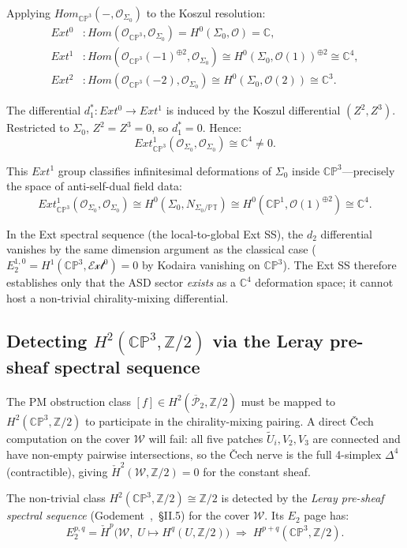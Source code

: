 \documentclass[11pt,a4paper]{article}
\theoremstyle{remark}
\newcommand{\PT}{\mathbb{PT}}
\newcommand{\CP}{\mathbb{CP}}
\newcommand{\C}{\mathbb{C}}
\newcommand{\Z}{\mathbb{Z}}
\newcommand{\cO}{\mathcal{O}}
\newcommand{\barPP}{\overline{\mathcal{P}}}
\begin{document}
Applying $Hom_{\CP^3}(-, \mathcal{O}_{\Sigma_0})$ to the Koszul resolution:
\begin{align*}
  Ext^0 &: Hom(\mathcal{O}_{\CP^3}, \mathcal{O}_{\Sigma_0})
    = H^0(\Sigma_0, \mathcal{O}) = \C, \\
  Ext^1 &: Hom(\mathcal{O}_{\CP^3}(-1)^{\oplus 2},
    \mathcal{O}_{\Sigma_0})
    \cong H^0(\Sigma_0, \mathcal{O}(1))^{\oplus 2}
    \cong \C^4, \\
  Ext^2 &: Hom(\mathcal{O}_{\CP^3}(-2),
    \mathcal{O}_{\Sigma_0})
    \cong H^0(\Sigma_0, \mathcal{O}(2)) \cong \C^3.
\end{align*}

The differential $d_1^*: Ext^0 \to Ext^1$ is induced by the Koszul
differential $(Z^2, Z^3)$. Restricted to $\Sigma_0$, $Z^2 = Z^3 = 0$,
so $d_1^* = 0$. Hence:
\[
  Ext^1_{\CP^3}(\mathcal{O}_{\Sigma_0}, \mathcal{O}_{\Sigma_0})
  \cong \C^4 \neq 0.
\]

This $Ext^1$ group classifies infinitesimal deformations of $\Sigma_0$
inside $\CP^3$---precisely the space of anti-self-dual field data:
\[
  Ext^1_{\CP^3}(\mathcal{O}_{\Sigma_0}, \mathcal{O}_{\Sigma_0})
  \cong H^0(\Sigma_0, N_{\Sigma_0/\PT})
  \cong H^0(\CP^1, \cO(1)^{\oplus 2}) \cong \C^4.
\]

In the Ext spectral sequence (the local-to-global Ext SS), the $d_2$
differential vanishes by the same dimension argument as the classical case
($E_2^{1,0} = H^1(\CP^3, \mathcal{Ext}^0) = 0$ by Kodaira vanishing on
$\CP^3$). The Ext SS therefore establishes only that the ASD sector
\emph{exists} as a $\C^4$ deformation space; it cannot host a non-trivial
chirality-mixing differential.

\subsection{Detecting $H^2(\CP^3, \Z/2)$ via the Leray pre-sheaf spectral sequence}
\label{sec:leray-ss}

The PM obstruction class $[f] \in H^2(\barPP_2, \Z/2)$ must be
mapped to $H^2(\CP^3, \Z/2)$ to participate in the chirality-mixing
pairing. A direct \v{C}ech computation on the cover $\mathcal{W}$
will fail: all five patches $\tilde{U}_i, V_2, V_3$ are connected
and have non-empty pairwise intersections, so the \v{C}ech nerve
is the full 4-simplex $\Delta^4$ (contractible), giving
$\check{H}^2(\mathcal{W}, \Z/2) = 0$ for the constant sheaf.

The non-trivial class $H^2(\CP^3, \Z/2) \cong \Z/2$ is detected by
the \emph{Leray pre-sheaf spectral sequence} (Godement~\cite{Godement1958},~\S II.5)
for the cover $\mathcal{W}$.  Its $E_2$ page has:
\[
  E_2^{p,q} = \check{H}^p\bigl(\mathcal{W},\;
    U \mapsto H^q(U, \Z/2)\bigr)
  \;\Longrightarrow\; H^{p+q}(\CP^3, \Z/2).
\]
\end{document}
